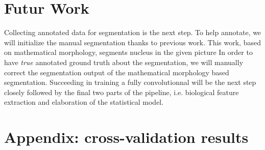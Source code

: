 \documentclass[a4paper,10pt]{article}
\begin{document}

\section{Futur Work}

Collecting annotated data for segmentation is the next step. To help annotate, we will initialize the manual segmentation thanks to previous work. This work, based on mathematical morphology, segments nucleus in the given picture In order to have \textit{true} annotated ground truth about the segmentation, we will manually correct the segmentation output of the mathematical morphology based segmentation. Succeeding in training a fully convolutionnal will be the next step closely followed by the final two parts of the pipeline, i.e. biological feature extraction and elaboration of the statistical model. 

\newpage
\section*{Appendix: cross-validation results}
\end{document}
